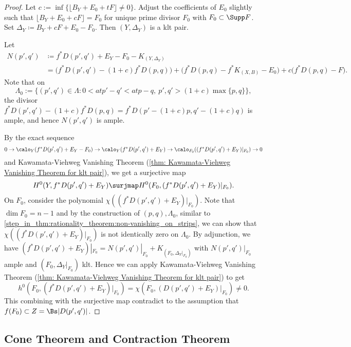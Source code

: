 \begin{proof}
        Let \(c := \inf\{ \lfloor B_Y + E_0 + t F \rfloor \neq 0\}\).
        Adjust the coefficients of \(E_0\) slightly such that \(\lfloor B_Y + E_0 + c F \rfloor = F_0\) for unique prime divisor \(F_0\) with \(F_0 \subset \Supp F\).
        Set \(\Delta_Y \coloneqq B_Y + c F + E_0 - F_0\).
        Then \((Y,\Delta_Y)\) is a klt pair.

        Let 
        \begin{align*}
            N(p',q') &\coloneqq f^*D(p',q') + E_Y - F_0 - K_{(Y,\Delta_Y)}  \\
                & = \Big(f^*D(p',q') - (1+c)f^*D(p,q)\Big) + \Big(f^*D(p,q) - f^*K_{(X,B)} - E_0\Big) + c \Big(f^*D(p,q) - F\Big).
        \end{align*} 
        Note that on 
        \[ \Lambda_0 := \{(p',q') \in \Lambda: 0< atp' - q' < atp - q,\  p',q'>(1+c)\max\{p,q\}\}, \]
        the divisor \(f^*D(p',q') - (1+c)f^*D(p,q) = f^*D(p'-(1+c)p,q'-(1+c)q)\) is ample, and hence \(N(p',q')\) is ample.

        By the exact sequence 
        \[ 0 \to \calo_Y(f^*D(p',q')+E_Y-F_0) \to \calo_Y(f^*D(p',q')+E_Y) \to \calo_{F_0}((f^*D(p',q')+E_Y)|_{F_0}) \to 0 \]
        and Kawamata-Viehweg Vanishing Theorem (\cref{thm: Kawamata-Viehweg Vanishing Theorem for klt pair}), we get a surjective map
        \[ H^0(Y,f^*D(p',q')+E_Y) \surjmap H^0(F_0,(f^*D(p',q')+E_Y)|_{F_0}). \]
        On \(F_0\), consider the polynomial \(\chi((f^*D(p',q')+E_Y)|_{F_0})\).
        Note that \(\dim F_0 = n-1\) and by the construction of \((p,q),\Lambda_0\), 
        similar to \cref{step_in_thm:rationality_theorem:non-vanishing_on_strips}, 
        we can show that \(\chi((f^*D(p',q')+E_Y)|_{F_0})\) is not identically zero on \(\Lambda_0\).
        By adjunction, we have \((f^*D(p',q')+E_Y)|_{F_0} = N(p',q')|_{F_0} + K_{(F_0,\Delta_Y|_{F_0})}\) with \(N(p',q')|_{F_0}\) ample and \((F_0,\Delta_Y|_{F_0})\) klt.
        Hence we can apply Kawamata-Viehweg Vanishing Theorem (\cref{thm: Kawamata-Viehweg Vanishing Theorem for klt pair}) to get
        \[ h^0(F_0,(f^*D(p',q')+E_Y)|_{F_0}) = \chi(F_0,(D(p',q')+E_Y)|_{F_0}) \neq 0.\]
        This combining with the surjective map contradict to the assumption that \(f(F_0) \subset Z = \Bs |D(p',q')|\).
    \end{proof}


\subsection{Cone Theorem and Contraction Theorem}

